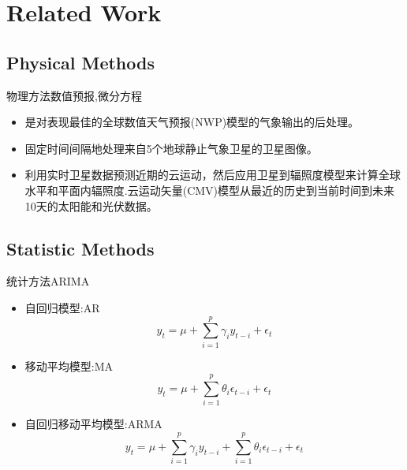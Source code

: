 \documentclass{ctexbeamer}
\begin{document}
\section{Related Work}
\subsection{Physical Methods}

    \begin{frame}{物理方法}{数值预报,微分方程}
        \begin{itemize}
        \item
        是对表现最佳的全球数值天气预报(NWP)模型的气象输出的后处理。
        \item
        固定时间间隔地处理来自5个地球静止气象卫星的卫星图像。
        \item
        利用实时卫星数据预测近期的云运动，然后应用卫星到辐照度模型来计算全球水平和平面内辐照度.云运动矢量(CMV)模型从最近的历史到当前时间到未来10天的太阳能和光伏数据。
        \end{itemize}
    \end{frame}

\subsection{Statistic Methods}
    \begin{frame}{统计方法}{ARIMA}
        \begin{itemize}
        \item 
        自回归模型:AR
        \begin{equation}
            y_t = \mu + \sum_{i=1}^{p}\gamma_i y_{t-i} + \epsilon_t
        \end{equation}

        \item 
        移动平均模型:MA
        \begin{equation}
            y_t = \mu + \sum_{i=1}^{p}\theta_i \epsilon_{t-i} + \epsilon_t
        \end{equation}

        \item 
        自回归移动平均模型:ARMA
        \begin{equation}
            y_t = \mu + \sum_{i=1}^{p}\gamma_i y_{t-i} + \sum_{i=1}^{p}\theta_i \epsilon_{t-i} + \epsilon_t
        \end{equation}

        \end{itemize}

    \end{frame}
\end{document}
